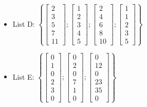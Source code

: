 \begin{itemize}
\item 
List D:
$\left\{\left[ \begin{array}{c} 2 \\ 3 \\ 5 \\ 7 \\ 11 \end{array} \right] ;
\left[ \begin{array}{c} 1 \\ 2 \\ 3 \\ 4 \\5 \end{array} \right] ;
\left[ \begin{array}{c} 2 \\ 4 \\ 6 \\ 8 \\ 10 \end{array} \right] ; 
\left[ \begin{array}{c} 1 \\ 1 \\ 2 \\ 3 \\ 5 \end{array} \right] \right\} $

\item 
List E:
$\left\{\left[ \begin{array}{c} 0 \\ 1 \\ 0\\ 2 \\ 3 \\ 0 \end{array} \right] ;
\left[ \begin{array}{c} 0 \\ 2 \\ 0\\ 7 \\ 1 \\ 0 \end{array} \right] ;
\left[ \begin{array}{c} 0 \\ 12 \\ 0\\ 23 \\ 35 \\ 0 \end{array} \right] \right\}$



\end{itemize}
